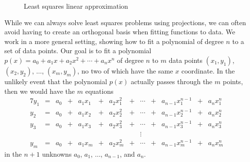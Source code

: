 \begin{figure}[h]
\begin{center}
\caption{Least squares linear approximation}
\label{F:LS_Olympics2}
\end{center}
\end{figure}

While we can always solve least squares problems using projections, we can often avoid having to create an orthogonal basis when fitting functions to data. We work in a more general setting, showing how to fit a polynomial of degree $n$ to a set of data points. Our goal is to fit a polynomial $p(x) = a_0+a_1x+a_2x^2+ \cdots + 
a_nx^n$ of degree $n$ to $m$ data points $(x_1,y_1)$, $(x_2,y_2)$, $\ldots$, $(x_m,y_m)$, no two of which have the same $x$ coordinate. In the unlikely event that the polynomial $p(x)$ actually passes through the $m$ points, then we would have the $m$ equations
\begin{alignat*}{7}
y_1 &{}={} &{a_0} &{}+{} &{a_1}x_1 &{}+{} &{a_2}x_1^2 &{}+{} &\cdots &{}+{} &{a_{n-1}}x_1^{n-1} &{}+{} &{a_n}x_1^n  \\
y_2 &{}={} &{a_0} &{}+{} &{a_1}x_2 &{}+{} &{a_2}x_2^2 &{}+{} &\cdots &{}+{} &{a_{n-1}}x_2^{n-1} &{}+{} &{a_n}x_2^n  \\
y_3 &{}={} &{a_0} &{}+{} &{a_1}x_3 &{}+{} &{a_2}x_3^2 &{}+{} &\cdots &{}+{} &{a_{n-1}}x_3^{n-1} &{}+{} &{a_n}x_3^n  \\
{}   &{}     &{}       &{}      &{}          &{}      &{}             &{}       &\vdots &{}     &{}                            &{}       &{}            \\
y_m &{}={} &{a_0} &{}+{} &{a_1}x_m &{}+{} &{a_2}x_m^2 &{}+{} &\cdots &{}+{} &{a_{n-1}}x_m^{n-1} &{}+{} &{a_n}x_m^n
\end{alignat*}
in the $n+1$ unknowns $a_0$, $a_1$, $\ldots$, $a_{n-1}$, and $a_n$.

